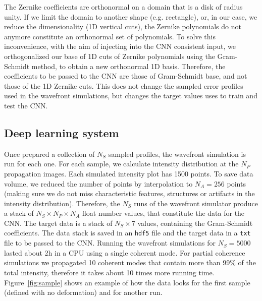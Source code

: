 \documentclass[preprint]{iucr}
\begin{document}
The Zernike coefficients are orthonormal on a domain that is a disk of radius unity. If we limit the domain to another shape (e.g. rectangle), or, in our case, we reduce the dimensionality (1D vertical cuts), the Zernike polynomials do not anymore constitute an orthonormal set of polynomials. To solve this inconvenience, with the aim of injecting into the CNN consistent input, we orthogonalized our base of 1D cuts of Zernike polynomials using the Gram-Schmidt method, to obtain a new orthonormal 1D basis. Therefore, the coefficients to be passed to the CNN are those of Gram-Schmidt base, and not those of the 1D Zernike cuts. This does not change the sampled error profiles used in the wavefront simulations, but changes the target values uses to train and test the CNN.  


\subsection{Deep learning system}

Once prepared a collection of $N_S$ sampled profiles, the wavefront simulation is run for each one. For each sample,  we calculate intensity distribution at the $N_P$ propagation images. Each simulated intensity plot has 1500 points. To save data volume, we reduced the number of points by interpolation to $N_A=256$ points (making sure we do not miss characteristic features, structures or artifacts in the intensity distribution). Therefore, the $N_S$ runs of the wavefront simulator produce a stack of $N_S \times N_P \times N_A$ float number values, that constitute the data for the CNN. The target data is a stack of $N_S \times 7$ values, containing the Gram-Schmidt coefficients. The data stack is saved in an \texttt{hdf5} file and the target data in a \texttt{txt} file to be passed to the CNN. Running the wavefront simulations for $N_S=5000$ lasted about 2h in a CPU using a single coherent mode. For partial coherence simulations we propagated 10 coherent modes that contain more than 99\% of the total intensity, therefore it takes about 10 times more running time. Figure~\ref{fig:sample} shows an example of how the data looks for the first sample (defined with no deformation) and for another run.
\end{document}
